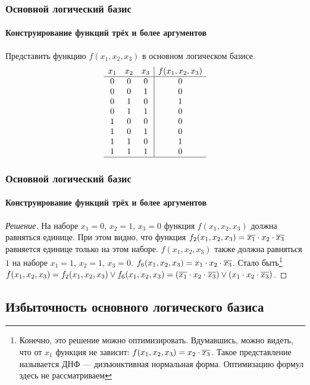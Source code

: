 \begin{frame}
    \frametitle{Основной логический базис}
    \framesubtitle{Конструирование функций трёх и более аргументов}
    
    \begin{example}[Задача] 
        Представить функцию $f(x_1,x_2,x_3)$ в основном логическом базисе.
        \[
            \begin{array}{ccc|c}
                x_1&x_2&x_3&f(x_1,x_2,x_3)\\
                \hline
                0&0&0&0\\
                0&0&1&0\\
                0&1&0&1\\
                0&1&1&0\\
                1&0&0&0\\
                1&0&1&0\\
                1&1&0&1\\
                1&1&1&0\\
                \hline
            \end{array}    
        \]
    \end{example}
\end{frame}

\begin{frame}
    \frametitle{Основной логический базис}
    \framesubtitle{Конструирование функций трёх и более аргументов}
    
    \begin{proof}[Решение]
        На наборе $x_1=0$, $x_2=1$, $x_3=0$ функция $f(x_1,x_2,x_3)$ должна равняться единице. При этом видно, что функция $f_2(x_1,x_2,x_3)=\overline{x_1}\cdot x_2 \cdot\overline{x_3}$ равняется единице только на этом наборе. $f(x_1,x_2,x_3)$ также должна равняться $1$ на наборе $x_1=1$, $x_2=1$, $x_3=0$. $f_6(x_1,x_2,x_3)=x_1\cdot x_2 \cdot\overline{x_3}$. Стало быть\footnote{Конечно, это решение можно оптимизировать. Вдумавшись, можно видеть, что от $x_1$ функция не зависит: $f(x_1,x_2,x_3)=x_2 \cdot\overline{x_3}$. Такое представление называется ДНФ --- дизъюнктивная нормальная форма. Оптимизацию формул здесь не рассматриваем} $f(x_1,x_2,x_3)=f_2(x_1,x_2,x_3)\lor f_6(x_1,x_2,x_3)=(\overline{x_1}\cdot x_2 \cdot\overline{x_3})\lor(x_1\cdot x_2 \cdot\overline{x_3})$.
    \end{proof}
\end{frame}

\subsection{Избыточность основного логического базиса}

